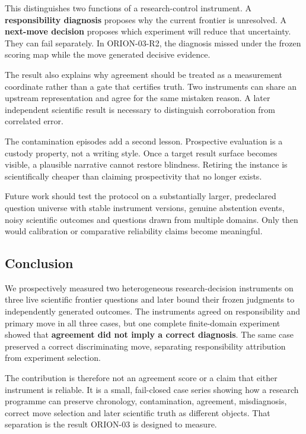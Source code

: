 \documentclass[10pt]{article}
\begin{document}
This distinguishes two functions of a research-control instrument. A
\textbf{responsibility diagnosis} proposes why the current frontier is
unresolved. A \textbf{next-move decision} proposes which experiment will
reduce that uncertainty. They can fail separately. In ORION-03-R2, the
diagnosis missed under the frozen scoring map while the move generated
decisive evidence.

The result also explains why agreement should be treated as a
measurement coordinate rather than a gate that certifies truth. Two
instruments can share an upstream representation and agree for the same
mistaken reason. A later independent scientific result is necessary to
distinguish corroboration from correlated error.

The contamination episodes add a second lesson. Prospective evaluation
is a custody property, not a writing style. Once a target result surface
becomes visible, a plausible narrative cannot restore blindness.
Retiring the instance is scientifically cheaper than claiming
prospectivity that no longer exists.

Future work should test the protocol on a substantially larger,
predeclared question universe with stable instrument versions, genuine
abstention events, noisy scientific outcomes and questions drawn from
multiple domains. Only then would calibration or comparative reliability
claims become meaningful.

\hypertarget{conclusion}{%
\subsection{Conclusion}\label{conclusion}}

We prospectively measured two heterogeneous research-decision
instruments on three live scientific frontier questions and later bound
their frozen judgments to independently generated outcomes. The
instruments agreed on responsibility and primary move in all three
cases, but one complete finite-domain experiment showed that
\textbf{agreement did not imply a correct diagnosis}. The same case
preserved a correct discriminating move, separating responsibility
attribution from experiment selection.

The contribution is therefore not an agreement score or a claim that
either instrument is reliable. It is a small, fail-closed case series
showing how a research programme can preserve chronology, contamination,
agreement, misdiagnosis, correct move selection and later scientific
truth as different objects. That separation is the result ORION-03 is
designed to measure.
\end{document}
